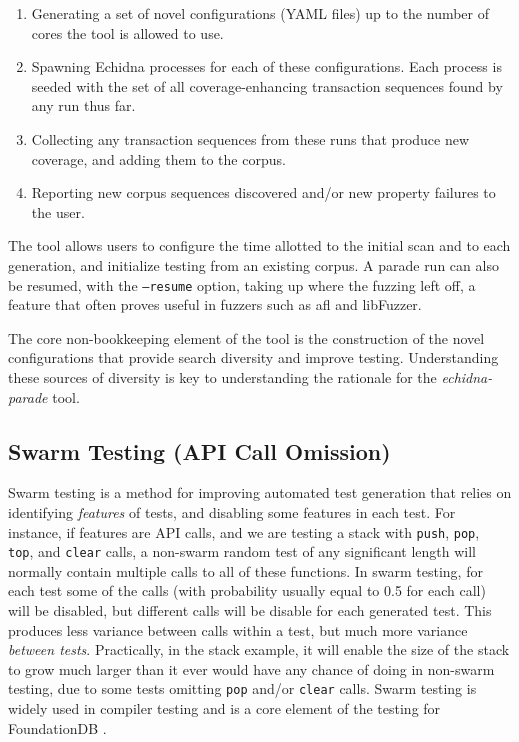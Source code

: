 \documentclass[sigconf,screen]{acmart}
\begin{document}
{\begin{enumerate}
  \item Generating a set of novel configurations (YAML files) up to the
    number of cores the tool is allowed to use. 
    \item Spawning Echidna processes for each of these
      configurations.  Each process is seeded with the set of all
      coverage-enhancing transaction sequences found by any run thus far.
      \item Collecting any transaction sequences from these runs that
        produce new coverage, and adding them to the corpus.
        \item Reporting new corpus sequences discovered and/or new property failures to
          the user.
        \end{enumerate}

The tool allows users to configure the time allotted to the initial scan and to each generation, and initialize testing from an existing corpus.  A parade run can also be resumed, with the {\tt --resume} option, taking up where the fuzzing left off, a feature that often proves useful in fuzzers such as afl and libFuzzer.
        
The core non-bookkeeping element of the tool is the construction of the
novel configurations that provide search diversity and improve
testing.  Understanding these sources of diversity is key to
understanding the rationale for the \emph{echidna-parade} tool.

\subsection{Swarm Testing (API Call Omission)}

Swarm testing \cite{ISSTA12} is a method for improving automated test
generation that relies on identifying \emph{features} of tests, and
disabling some features in each test.  For instance, if features are
API calls, and we are testing a stack with {\tt push}, {\tt pop}, {\tt
  top}, and {\tt clear} calls, a non-swarm random test of any
significant length will normally contain multiple calls to all of
these functions.  In swarm testing, for each test some of the calls
(with probability usually equal to 0.5 for each call) will be
disabled, but different calls will be disable for each generated
test.  This produces less variance between calls within a test, but
much more variance \emph{between tests}.  Practically, in the stack
example, it will enable the size of the stack to grow much larger than
it ever would have any chance of doing in non-swarm testing, due to
some tests omitting {\tt pop} and/or {\tt clear} calls.  Swarm testing
is widely used in compiler testing
\cite{le2014compiler} and is a core element of the
testing for FoundationDB \cite{zhou2021foundationdb}.

}
\end{document}
